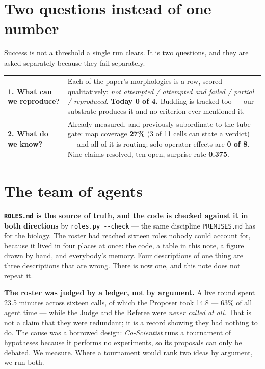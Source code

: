 \documentclass[11pt,a4paper]{article}
\newcommand{\code}[1]{\texttt{#1}}
\begin{document}
\section{Two questions instead of one number}

Success is not a threshold a single run clears. It is two questions, and they are asked separately
because they fail separately.

\begin{center}\small
\begin{tabular}{@{}p{4.3cm} p{10.3cm}@{}}
\toprule
\textbf{1. What can we reproduce?}
& Each of the paper's morphologies is a row, scored qualitatively: \emph{not attempted / attempted
and failed / partial / reproduced}. \textbf{Today 0 of 4.} Budding is tracked too --- our substrate
produces it and no criterion ever mentioned it.\\
\addlinespace
\textbf{2. What do we know?}
& Already measured, and previously subordinate to the tube gate: map coverage \textbf{27\%} (3 of 11
cells can state a verdict) --- and all of it is routing; solo operator effects are \textbf{0 of 8}.
Nine claims resolved, ten open, surprise rate \textbf{0.375}.\\
\bottomrule
\end{tabular}
\end{center}

\section{The team of agents}\label{sec:agents}

\textbf{\code{ROLES.md} is the source of truth, and the code is checked against it in both
directions} by \code{roles.py -{}-check} --- the same discipline \code{PREMISES.md} has for the
biology. The roster had reached sixteen roles nobody could account for, because it lived in four
places at once: the code, a table in this note, a figure drawn by hand, and everybody's memory.
Four descriptions of one thing are three descriptions that are wrong. There is now one, and this
note does not repeat it.

\textbf{The roster was judged by a ledger, not by argument.} A live round spent 23.5 minutes across
sixteen calls, of which the Proposer took 14.8 --- 63\% of all agent time --- while the Judge and
the Referee were \emph{never called at all}. That is not a claim that they were redundant; it is a
record showing they had nothing to do. The cause was a borrowed design: \emph{Co-Scientist} runs a
tournament of hypotheses because it performs no experiments, so its proposals can only be debated.
We measure. Where a tournament would rank two ideas by argument, we run both.
\end{document}
